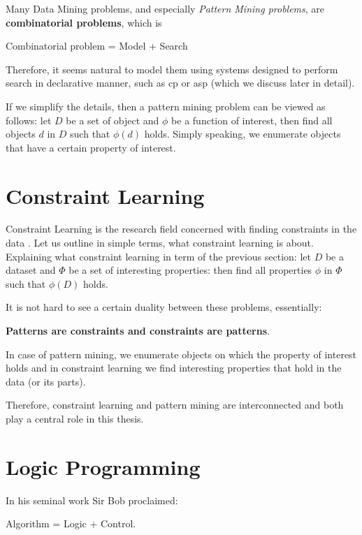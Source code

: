 Many Data Mining problems, and especially \textit{Pattern Mining
problems}, are \textbf{combinatorial problems}, which
is 

\begin{center}
  Combinatorial problem = Model + Search
\end{center}

Therefore, it seems natural to model them using systems designed to
perform search in declarative manner, such as \acrlong{cp} or
\acrlong{asp} (which we discuss later in detail).

If we simplify the details, then a pattern mining problem can be
viewed as follows: let $D$ be a set of object and $\phi$ be a function of
interest, then find all objects $d$ in $D$ such that $\phi(d)$ holds.
Simply speaking, we enumerate objects that have a certain property of
interest.


\section{Constraint Learning}
Constraint Learning is the research field concerned with finding
constraints in the data \parencite{constraint_learning,QUACQ,Conacq}.
Let us outline in simple terms, what constraint learning is about.
Explaining what constraint learning in term of the previous section:
let $D$ be a dataset and $\Phi$ be a set of interesting properties:
then find all properties $\phi$ in $\Phi$ such that $\phi(D)$ holds.

It is not hard to see a certain duality between these problems, essentially:
\begin{center}
  \textbf{Patterns are constraints and constraints are patterns}.
\end{center}

In case of pattern mining, we enumerate objects on which the property
of interest holds and in constraint learning we find interesting
properties that hold in the data (or its parts).

Therefore, constraint learning and pattern mining are interconnected
and both play a central role in this thesis.

\section{Logic Programming}
In his seminal work Sir Bob \textcite{kowalski} proclaimed:
\begin{center}
  Algorithm = Logic + Control.
\end{center}

